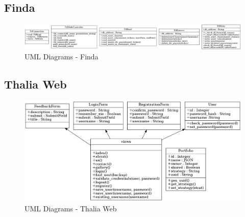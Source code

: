 \documentclass[main.tex]{subfiles}
\begin{document}
\subsection{Finda}

\begin{figure}[H]
   \centering
   \includegraphics[scale=0.8]{Report/08Appendices/084UML/084Pictures/classes_Finda.png}
   \caption{UML Diagrams - Finda}
\end{figure}

\subsection{Thalia Web}

\begin{figure}[H]
   \centering
   \includegraphics[scale=0.8]{Report/08Appendices/084UML/084Pictures/classes_thalia.png}
   \caption{UML Diagrams - Thalia Web}
\end{figure}
\end{document}
